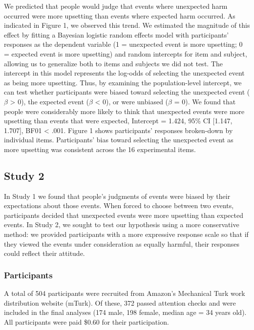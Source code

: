 \documentclass[9pt,twocolumn,twoside,]{pnas-new}
\begin{document}
{We predicted that people would judge that events where unexpected harm
occurred were more upsetting than events where expected harm occurred.
As indicated in Figure 1, we observed this trend. We estimated the
magnitude of this effect by fitting a Bayesian logistic random effects
model with participants' responses as the dependent variable (1 =
unexpected event is more upsetting; 0 = expected event is more
upsetting) and random intercepts for item and subject, allowing us to
generalize both to items and subjects we did not test. The intercept in
this model represents the log-odds of selecting the unexpected event as
being more upsetting. Thus, by examining the population-level intercept,
we can test whether participants were biased toward selecting the
unexpected event (\(\beta\) \textgreater{} 0), the expected event
(\(\beta\) \textless{} 0), or were unbiased (\(\beta\) = 0). We found
that people were considerably more likely to think that unexpected
events were more upsetting than events that were expected, Intercept =
1.424, 95\% CI {[}1.147, 1.707{]}, BF01 \textless{} .001. Figure 1 shows
participants' responses broken-down by individual items. Participants'
bias toward selecting the unexpected event as more upsetting was
consistent across the 16 experimental items.

\subsection*{Study 2}\label{study2}

In Study 1 we found that people's judgments of events were biased by
their expectations about those events. When forced to choose between two
events, participants decided that unexpected events were more upsetting
than expected events. In Study 2, we sought to test our hypothesis using
a more conservative method: we provided participants with a more
expressive response scale so that if they viewed the events under
consideration as equally harmful, their responses could reflect their
attitude.

\subsubsection*{Participants}\label{s2-participants}

A total of 504 participants were recruited from Amazon's Mechanical Turk
work distribution website (mTurk). Of these, 372 passed attention checks
and were included in the final analyses (174 male, 198 female, median
age = 34 years old). All participants were paid \$0.60 for their
participation.

}
\end{document}
